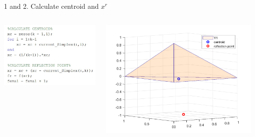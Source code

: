 \documentclass{beamer}
\begin{document}
\begin{frame}{1 and 2. Calculate centroid and $x^r$}
	\begin{columns}
	\begin{column}{0.35\linewidth}
		\centering
		\includegraphics[width=0.95\linewidth]{Order2}
	\end{column}
	\begin{column}{0.59\linewidth}
		\centering
		\includegraphics[width=0.95\linewidth]{Order2Fig}
	\end{column}
	\end{columns}
\end{frame}
\end{document}
